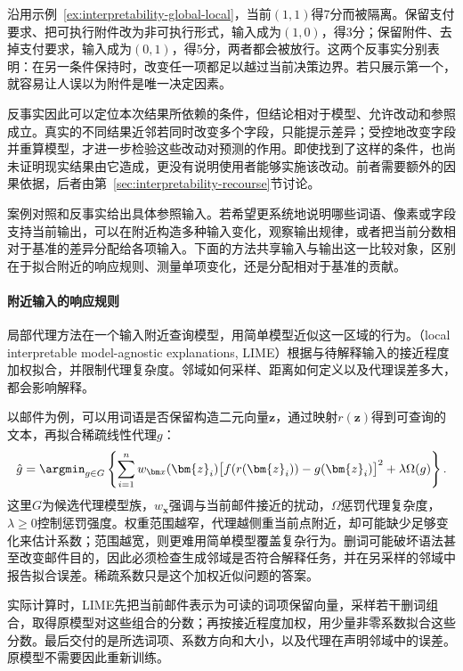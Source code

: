 沿用示例~\ref{ex:interpretability-global-local}，当前$(1,1)$得7分而被隔离。保留支付要求、把可执行附件改为非可执行形式，输入成为$(1,0)$，得3分；保留附件、去掉支付要求，输入成为$(0,1)$，得5分，两者都会被放行。这两个反事实分别表明：在另一条件保持时，改变任一项都足以越过当前决策边界。若只展示第一个，就容易让人误以为附件是唯一决定因素。

反事实因此可以定位本次结果所依赖的条件，但结论相对于模型、允许改动和参照成立。真实的不同结果近邻若同时改变多个字段，只能提示差异；受控地改变字段并重算模型，才进一步检验这些改动对预测的作用。即使找到了这样的条件，也尚未证明现实结果由它造成，更没有说明使用者能够实施该改动。前者需要额外的因果依据，后者由第~\ref{sec:interpretability-recourse}节讨论。

案例对照和反事实给出具体参照输入。若希望更系统地说明哪些词语、像素或字段支持当前输出，可以在附近构造多种输入变化，观察输出规律，或者把当前分数相对于基准的差异分配给各项输入。下面的方法共享输入与输出这一比较对象，区别在于拟合附近的响应规则、测量单项变化，还是分配相对于基准的贡献。

\paragraph{附近输入的响应规则}
\label{sec:interpretability-local-neighborhood}

局部代理方法在一个输入附近查询模型，用简单模型近似这一区域的行为。（local interpretable model-agnostic explanations, LIME）根据与待解释输入的接近程度加权拟合，并限制代理复杂度。邻域如何采样、距离如何定义以及代理误差多大，都会影响解释。

以邮件为例，可以用词语是否保留构造二元向量$\bm{z}$，通过映射$r(\bm{z})$得到可查询的文本，再拟合稀疏线性代理$g$：
\begin{equation}
 \hat g=\argmin_{g\in G}\left\{
 \sum_{i=1}^{n}w_{\bm x}(\bm{z}_i)
 \bigl[f(r(\bm{z}_i))-g(\bm{z}_i)\bigr]^2
 +\lambda\Omega(g)\right\}.
 \label{eq:interpretability-lime}
\end{equation}
这里$G$为候选代理模型族，$w_{\bm x}$强调与当前邮件接近的扰动，$\Omega$惩罚代理复杂度，$\lambda\geq0$控制惩罚强度。权重范围越窄，代理越侧重当前点附近，却可能缺少足够变化来估计系数；范围越宽，则更难用简单模型覆盖复杂行为。删词可能破坏语法甚至改变邮件目的，因此必须检查生成邻域是否符合解释任务，并在另采样的邻域中报告拟合误差。稀疏系数只是这个加权近似问题的答案。

实际计算时，LIME先把当前邮件表示为可读的词项保留向量，采样若干删词组合，取得原模型对这些组合的分数；再按接近程度加权，用少量非零系数拟合这些分数。最后交付的是所选词项、系数方向和大小，以及代理在声明邻域中的误差。原模型不需要因此重新训练。

